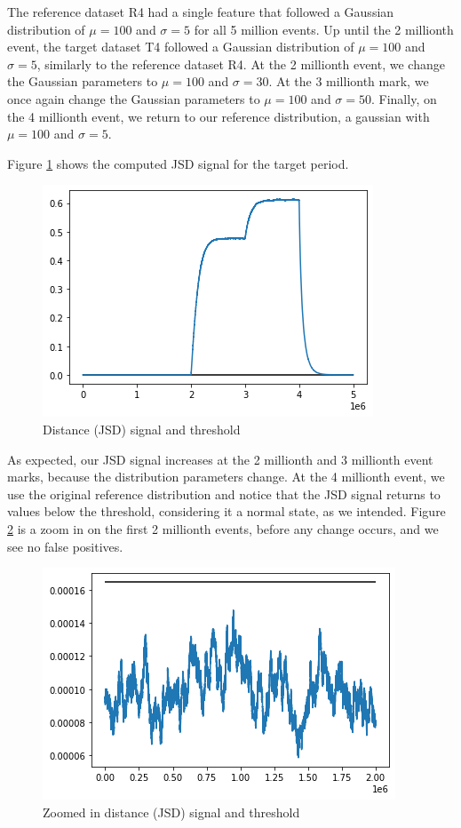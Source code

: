 The reference dataset R4 had a single feature that followed a Gaussian distribution of $\mu=100$ and $\sigma=5$ for all 5 million events. Up until the 2 millionth event, the target dataset T4 followed a Gaussian distribution of $\mu=100$ and $\sigma=5$, similarly to the reference dataset R4. At the 2 millionth event, we change the Gaussian parameters to $\mu=100$ and $\sigma=30$. At the 3 millionth mark, we once again change the Gaussian parameters to $\mu=100$ and $\sigma=50$. Finally, on the 4 millionth event, we return to our reference distribution, a gaussian with $\mu=100$ and $\sigma=5$.


Figure \ref{fig:JSD-signal-test04} shows the computed JSD signal for the target period.
\begin{figure}[!htb]
    \begin{center}
      \includegraphics[scale=0.6]{figures/stream-analysis-viz-test04.png}
      \caption[]{Distance (JSD) signal and threshold}
      \label{fig:JSD-signal-test04}
    \end{center}
\end{figure}
As expected, our JSD signal increases at the 2 millionth and 3 millionth event marks, because the distribution parameters change. At the 4 millionth event, we use the original reference distribution and notice that the JSD signal returns to values below the threshold, considering it a normal state, as we intended. Figure \ref{fig:JSD-signal-zoom-test04} is a zoom in on the first 2 millionth events, before any change occurs, and we see no false positives.
\begin{figure}[!htb]
    \begin{center}
      \includegraphics[scale=0.6]{figures/stream-analysis-viz-zoom-test04.png}
      \caption[]{Zoomed in distance (JSD) signal and threshold}
      \label{fig:JSD-signal-zoom-test04}
    \end{center}
\end{figure}


